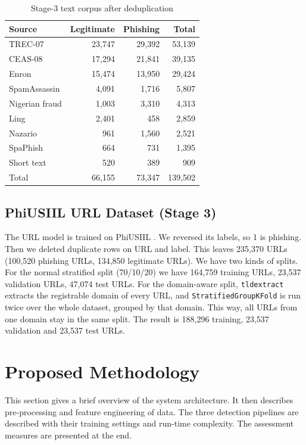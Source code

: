 \documentclass[conference]{IEEEtran}
\begin{document}
\begin{table}[t]
\centering
\caption{Stage-3 text corpus after deduplication}
\label{tab:textdata}
\begin{tabular}{lrrr}
\toprule
Source & Legitimate & Phishing & Total \\
\midrule
TREC-07 & 23,747 & 29,392 & 53,139 \\
CEAS-08 & 17,294 & 21,841 & 39,135 \\
Enron & 15,474 & 13,950 & 29,424 \\
SpamAssassin & 4,091 & 1,716 & 5,807 \\
Nigerian fraud & 1,003 & 3,310 & 4,313 \\
Ling & 2,401 & 458 & 2,859 \\
Nazario & 961 & 1,560 & 2,521 \\
SpaPhish & 664 & 731 & 1,395 \\
Short text & 520 & 389 & 909 \\
\midrule
Total & 66,155 & 73,347 & 139,502 \\
\bottomrule
\end{tabular}
\end{table}

\subsection{PhiUSIIL URL Dataset (Stage 3)}\label{sec:url-data}
The URL model is trained on PhiUSIIL \cite{prasad2024phiusiil}. We reversed its labels, so 1 is phishing. Then we deleted duplicate rows on URL and label. This leaves 235,370 URLs (100,520 phishing URLs, 134,850 legitimate URLs). We have two kinds of splits. For the normal stratified split (70/10/20) we have 164,759 training URLs, 23,537 validation URLs, 47,074 test URLs. For the domain-aware split, \texttt{tldextract} extracts the registrable domain of every URL, and \texttt{StratifiedGroupKFold} is run twice over the whole dataset, grouped by that domain. This way, all URLs from one domain stay in the same split. The result is 188,296 training, 23,537 validation and 23,537 test URLs.

\section{Proposed Methodology}
This section gives a brief overview of the system architecture. It then describes pre-processing and feature engineering of data. The three detection pipelines are described with their training settings and run-time complexity. The assessment measures are presented at the end.
\end{document}
